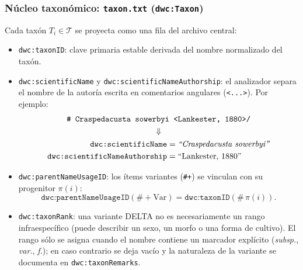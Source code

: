 \documentclass[11pt,a4paper]{article}
\theoremstyle{definition}
\theoremstyle{remark}
\begin{document}
\subsubsection{Núcleo taxonómico: \texttt{taxon.txt} (\texttt{dwc:Taxon})}
Cada taxón $T_i \in \mathcal{T}$ se proyecta como una fila del archivo central:
\begin{itemize}
    \item \texttt{dwc:taxonID}: clave primaria estable derivada del nombre normalizado del taxón.
    \item \texttt{dwc:scientificName} y \texttt{dwc:scientificNameAuthorship}: el analizador separa el nombre de la autoría escrita en comentarios angulares (\texttt{<...>}). Por ejemplo:
    \begin{gather*}
    \texttt{\# Craspedacusta sowerbyi <Lankester, 1880>/} \\
    \Downarrow \\
    \begin{aligned}
    \texttt{dwc:scientificName} &= \text{\textit{``Craspedacusta sowerbyi''}} \\
    \texttt{dwc:scientificNameAuthorship} &= \text{``Lankester, 1880''}
    \end{aligned}
    \end{gather*}
    \item \texttt{dwc:parentNameUsageID}: los ítems variantes (\texttt{\#+}) se vinculan con su progenitor $\pi(i)$:
    \begin{equation}
    \texttt{dwc:parentNameUsageID}(\#+\text{Var}) = \texttt{dwc:taxonID}(\#\,\pi(i)).
    \end{equation}
    \item \texttt{dwc:taxonRank}: una variante DELTA no es necesariamente un rango infraespecífico (puede describir un sexo, un morfo o una forma de cultivo). El rango sólo se asigna cuando el nombre contiene un marcador explícito (\textit{subsp.}, \textit{var.}, \textit{f.}); en caso contrario se deja vacío y la naturaleza de la variante se documenta en \texttt{dwc:taxonRemarks}.
\end{itemize}
\end{document}
